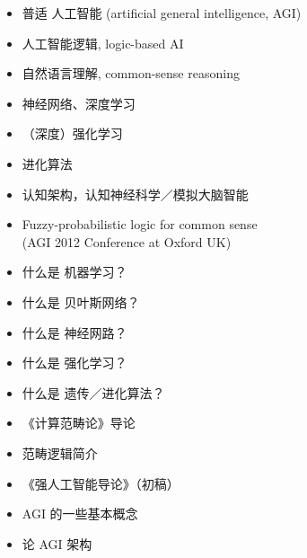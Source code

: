 \documentclass[10pt,a4paper]{altacv}
\begin{document}
\medskip


\begin{itemize}
	\item 普适 人工智能 (artificial general intelligence, AGI)
	\item 人工智能逻辑, logic-based AI
	\item 自然语言理解, common-sense reasoning
	\item 神经网络、深度学习
	\item （深度）强化学习
	\item 进化算法
	\item 认知架构，认知神经科学／模拟大脑智能
\end{itemize}

\medskip


\begin{itemize}
	\item Fuzzy-probabilistic logic for common sense \\
	(AGI 2012 Conference at Oxford UK)
\end{itemize}

%

\medskip


\begin{itemize}
	\item 什么是 机器学习？
	\item 什么是 贝叶斯网络？
	\item 什么是 神经网路？
	\item 什么是 强化学习？
	\item 什么是 遗传／进化算法？
	\item 《计算范畴论》导论
	\item 范畴逻辑简介
	\item 《强人工智能导论》（初稿）
	\item AGI 的一些基本概念
	\item 论 AGI 架构
\end{itemize}
\end{document}
